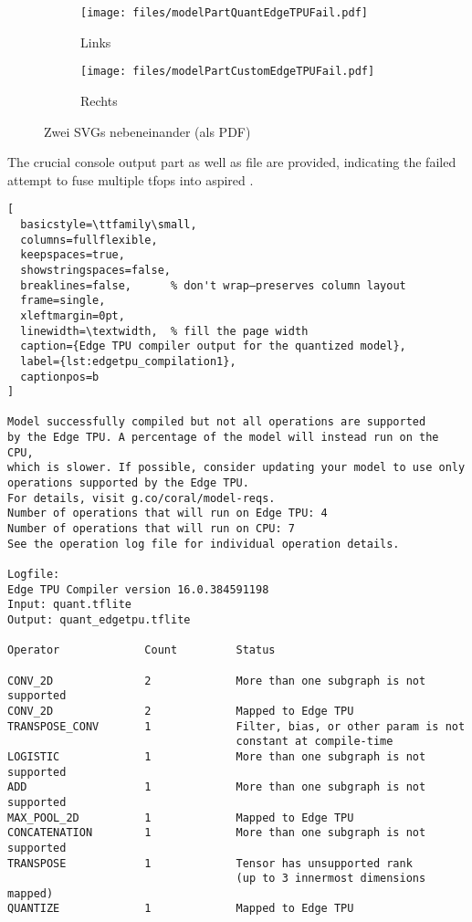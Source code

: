 {\begin{figure}[H]
  \centering
  \begin{subfigure}[t]{0.48\textwidth}
    \centering
    \texttt{[image: files/modelPartQuantEdgeTPUFail.pdf]}
    \caption{Links}
  \end{subfigure}
  \hfill
  \begin{subfigure}[t]{0.48\textwidth}
    \centering
    \texttt{[image: files/modelPartCustomEdgeTPUFail.pdf]}
    \caption{Rechts}
  \end{subfigure}
  \caption{Zwei SVGs nebeneinander (als PDF)}
\end{figure}

The crucial console output part as well as  file are provided, indicating the failed attempt to fuse multiple \glspl{tfop} into aspired .

\begin{lstlisting}[
  basicstyle=\ttfamily\small,
  columns=fullflexible,
  keepspaces=true,
  showstringspaces=false,
  breaklines=false,      % don't wrap—preserves column layout
  frame=single,
  xleftmargin=0pt,
  linewidth=\textwidth,  % fill the page width
  caption={Edge TPU compiler output for the quantized model},
  label={lst:edgetpu_compilation1},
  captionpos=b
]

Model successfully compiled but not all operations are supported
by the Edge TPU. A percentage of the model will instead run on the CPU,
which is slower. If possible, consider updating your model to use only
operations supported by the Edge TPU.
For details, visit g.co/coral/model-reqs.
Number of operations that will run on Edge TPU: 4
Number of operations that will run on CPU: 7
See the operation log file for individual operation details.

Logfile:
Edge TPU Compiler version 16.0.384591198
Input: quant.tflite
Output: quant_edgetpu.tflite

Operator             Count         Status
      
CONV_2D              2             More than one subgraph is not supported
CONV_2D              2             Mapped to Edge TPU
TRANSPOSE_CONV       1             Filter, bias, or other param is not
                                   constant at compile-time
LOGISTIC             1             More than one subgraph is not supported
ADD                  1             More than one subgraph is not supported
MAX_POOL_2D          1             Mapped to Edge TPU
CONCATENATION        1             More than one subgraph is not supported
TRANSPOSE            1             Tensor has unsupported rank
                                   (up to 3 innermost dimensions mapped)
QUANTIZE             1             Mapped to Edge TPU
\end{lstlisting}

}
